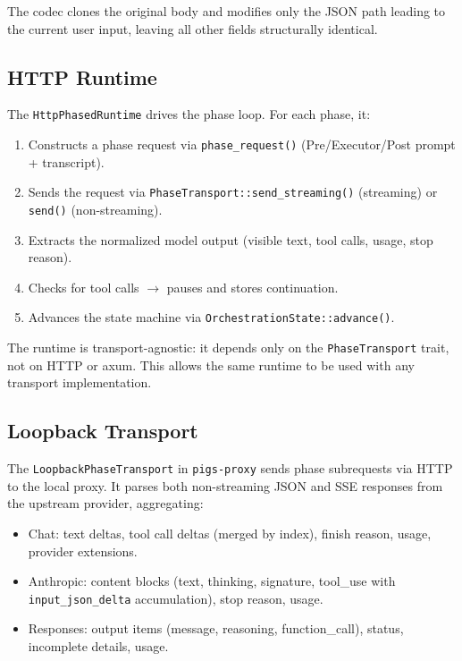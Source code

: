 The codec clones the original body and modifies only the JSON path leading to the current user input, leaving all other fields structurally identical.

\subsection{HTTP Runtime}

The \texttt{HttpPhasedRuntime} drives the phase loop. For each phase, it:
\begin{enumerate}[nosep]
    \item Constructs a phase request via \texttt{phase\_request()} (Pre/Executor/Post prompt + transcript).
    \item Sends the request via \texttt{PhaseTransport::send\_streaming()} (streaming) or \texttt{send()} (non-streaming).
    \item Extracts the normalized model output (visible text, tool calls, usage, stop reason).
    \item Checks for tool calls $\rightarrow$ pauses and stores continuation.
    \item Advances the state machine via \texttt{OrchestrationState::advance()}.
\end{enumerate}

The runtime is transport-agnostic: it depends only on the \texttt{PhaseTransport} trait, not on HTTP or axum. This allows the same runtime to be used with any transport implementation.

\subsection{Loopback Transport}

The \texttt{LoopbackPhaseTransport} in \texttt{pigs-proxy} sends phase subrequests via HTTP to the local proxy. It parses both non-streaming JSON and SSE responses from the upstream provider, aggregating:
\begin{itemize}[nosep]
    \item Chat: text deltas, tool call deltas (merged by index), finish reason, usage, provider extensions.
    \item Anthropic: content blocks (text, thinking, signature, tool\_use with \texttt{input\_json\_delta} accumulation), stop reason, usage.
    \item Responses: output items (message, reasoning, function\_call), status, incomplete details, usage.
\end{itemize}

